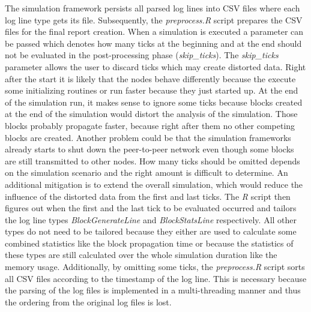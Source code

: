 The simulation framework persists all parsed log lines into CSV files where each log line type gets its file.
Subsequently, the \textit{preprocess.R} script prepares the CSV files for the final report creation.
When a simulation is executed a parameter can be passed which denotes how many ticks at the beginning and at the end should not be evaluated in the post-processing phase (\textit{skip\_ticks}).
The \textit{skip\_ticks} parameter allows the user to discard ticks which may create distorted data.
Right after the start it is likely that the nodes behave differently because the execute some initializing routines or run faster because they just started up.
At the end of the simulation run, it makes sense to ignore some ticks because blocks created at the end of the simulation would distort the analysis of the simulation.
Those blocks probably propagate faster, because right after them no other competing blocks are created.
Another problem could be that the simulation frameworks already starts to shut down the peer-to-peer network even though some blocks are still transmitted to other nodes.
How many ticks should be omitted depends on the simulation scenario and the right amount is difficult to determine.
An additional mitigation is to extend the overall simulation, which would reduce the influence of the distorted data from the first and last ticks.
The \textit{R} script then figures out when the first and the last tick to be evaluated occurred and tailors the log line types \textit{BlockGenerateLine} and \textit{BlockStatsLine} respectively.
All other types do not need to be tailored because they either are used to calculate some combined statistics like the block propagation time or because the statistics of these types are still calculated over the whole simulation duration like the memory usage.
Additionally, by omitting some ticks, the \textit{preprocess.R} script sorts all CSV files according to the timestamp of the log line.
This is necessary because the parsing of the log files is implemented in a multi-threading manner and thus the ordering from the original log files is lost.

